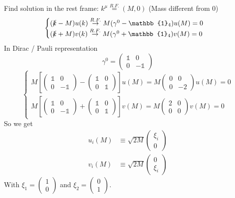 Find solution in the rest frame: $k^\mu \overset{R.F.}{=} (M,0)$
(Mass different from 0)
\[ \begin{cases}
(\slashed{k}-M)u(k) \overset{R.F.}{\rightarrow} M(\gamma^0 - \mathbb{1}_4)u(M) = 0 \\
(\slashed{k}+M)v(k) \overset{R.F.}{\rightarrow} M(\gamma^0 + \mathbb{1}_4)v(M) = 0
\end{cases} \]
In Dirac / Pauli representation
\[ \gamma^0 = \begin{pmatrix}
\mathbb{1} & 0 \\ 0 & -\mathbb{1}
\end{pmatrix} \]
\[ \begin{cases}
M \left[\begin{pmatrix}
\mathbb{1} & 0 \\ 0 & -\mathbb{1}
\end{pmatrix} - \begin{pmatrix}
\mathbb{1} & 0 \\ 0 & \mathbb{1}
\end{pmatrix}\right]u(M) = M \begin{pmatrix}
0 & 0 \\ 0 & -2
\end{pmatrix}u(M) = 0 \\
M \left[\begin{pmatrix}
\mathbb{1} & 0 \\ 0 & -\mathbb{1}
\end{pmatrix} + \begin{pmatrix}
\mathbb{1} & 0 \\ 0 & \mathbb{1}
\end{pmatrix}\right]v(M) = M \begin{pmatrix}
2 & 0 \\ 0 & 0
\end{pmatrix}v(M) = 0
\end{cases} \]
So we get
\begin{align*}
u_i(M) &\equiv \sqrt{2M} \begin{pmatrix}
\xi_i \\ 0
\end{pmatrix} \\
v_i(M) &\equiv \sqrt{2M} \begin{pmatrix}
0 \\ \xi_i
\end{pmatrix}
\end{align*}
With $\xi_1 = \begin{pmatrix}
1 \\ 0
\end{pmatrix}$ and $\xi_2 = \begin{pmatrix}
0 \\ 1
\end{pmatrix}$.

